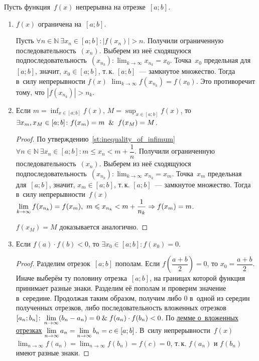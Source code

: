 Пусть функция~$f(x)$ непрерывна на отрезке~$[a; b]$.
\begin{enumerate}
	\item $f(x)$ ограничена на~$[a; b]$.
	\begin{proofcontra}
	Пусть $\forall n \in \mathbb N \ \exists x_n \in [a; b] \colon |f(x_n)| > n$.
	Получили ограниченную последовательность~$(x_n)$.
	Выберем из неё сходящуюся подпоследовательность~$\displaystyle (x_{n_k}) \colon \lim_{k \to \infty} x_{n_k} = x_0$.
	Точка~$x_0$ предельная для~$[a; b]$, значит, $x_0 \in [a; b]$, т.\,к. $[a; b]$~--- замкнутое множество.
	Тогда в~силу непрерывности $f(x)$ $\displaystyle \lim_{k \to \infty} f(x_{n_k}) = f(x_0)$.
	Это противоречит тому, что $|f(x_{n_k})| > n_k$.
	\end{proofcontra}
	
	\item\label{st:continuous_function_takes_inf_and_sup} Если $\displaystyle m = \inf_{x \in [a; b]} f(x)$, $\displaystyle M = \sup_{x \in [a; b]} f(x)$, то
	$\exists x_m, x_M \in [a; b] \colon f(x_m) = m \And f(x_M) = M$.
	\begin{proof}
	По утверждению~\ref{st:inequality_of_infimum} $\forall n \in \mathbb N \ \exists x_n \in [a; b] \colon m \leqslant x_n < m + \dfrac1n$.
	Получили ограниченную последовательность~$(x_n)$.
	Выберем из неё сходящуюся подпоследовательность~$\displaystyle (x_{n_k}) \colon \lim_{k \to \infty} x_{n_k} = x_m$.
	Точка~$x_m$ предельная для~$[a; b]$, значит, $x_m \in [a; b]$, т.\,к. $[a; b]$~--- замкнутое множество.
	Тогда в~силу непрерывности~$f(x)$ $\displaystyle \lim_{k \to \infty} f(x_{n_k}) = f(x_m), \ m \leqslant x_{n_k} < m + \frac1{n_k} \opbr\Rightarrow f(x_m) = m$.
	
	$f(x_M) = M$ доказывается аналогично.
	\end{proof}
	
	\item \begin{theorem}
	\label{th:zero_of_continuous_function}
	Если $f(a) \cdot f(b) < 0$, то $\exists x_0 \in [a; b] \colon f(x_0) = 0$.
	\end{theorem}
	\begin{proof}
	Разделим отрезок~$[a; b]$ пополам.
	Если $f\left( \dfrac{a + b}2 \right) = 0$, то $x_0 = \dfrac{a + b}2$.
	Иначе выберём ту половину отрезка~$[a; b]$, на границах которой функция принимает разные знаки.
	Разделим её пополам и проверим значение в~середине.
	Продолжая таким образом, получим либо $0$ в~одной из середин полученных отрезков, либо последовательность вложенных отрезков~$\displaystyle [a_n; b_n] \colon \lim_{n \to \infty} (b_n - a_n) = 0 \mathrel{\&} f(a_n) \cdot f(b_n) < 0$.
	По \hyperref[lemma:about_nested_intervals]{лемме о~вложенных отрезках} $\displaystyle \lim_{n \to \infty} a_n \opbr= \lim_{n \to \infty} b_n \opbr= c \in [a; b]$.
	В~силу непрерывности~$f(x)$ $\displaystyle \lim_{n \to \infty} f(a_n) = \lim_{n \to \infty} f(b_n) = f(c) = 0$, т.\,к. $f(a_n)$ и $f(b_n)$ имеют разные знаки.
	\end{proof}
	

\end{enumerate}

